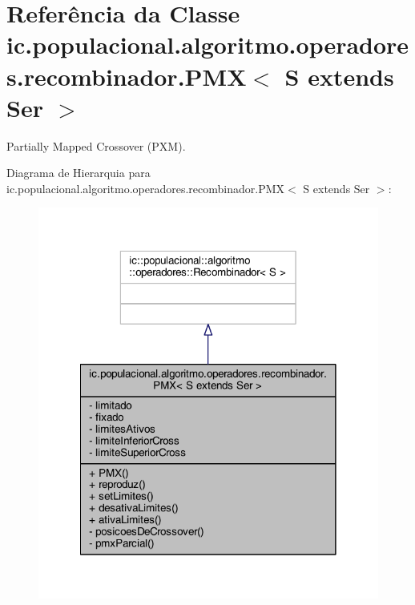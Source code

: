 \hypertarget{classic_1_1populacional_1_1algoritmo_1_1operadores_1_1recombinador_1_1_p_m_x_3_01_s_01extends_01_ser_01_4}{\section{Referência da Classe ic.\-populacional.\-algoritmo.\-operadores.\-recombinador.\-P\-M\-X$<$ S extends Ser $>$}
\label{classic_1_1populacional_1_1algoritmo_1_1operadores_1_1recombinador_1_1_p_m_x_3_01_s_01extends_01_ser_01_4}
}


Partially Mapped Crossover (P\-X\-M).  




Diagrama de Hierarquia para ic.\-populacional.\-algoritmo.\-operadores.\-recombinador.\-P\-M\-X$<$ S extends Ser $>$\-:\nopagebreak
\begin{figure}[H]
\begin{center}
\leavevmode
\includegraphics[width=318pt]{classic_1_1populacional_1_1algoritmo_1_1operadores_1_1recombinador_1_1_p_m_x_3_01_s_01extends_01_ser_01_4__inherit__graph}
\end{center}
\end{figure}


